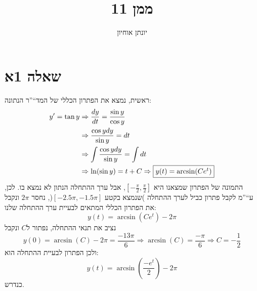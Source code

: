 \documentclass[11pt, oneside]{article}
\title{ממן 11}
\author{יונתן אוחיון}
\newcommand{\qed}{\R{$\blacksquare$}}
\newcommand{\logr}{\Rightarrow}
\begin{document}
\maketitle
\newpage

\section*{שאלה 1א}
ראשית, נמצא את הפתרון הכללי של המד``''ר הנתונה:
\begin{align*}
y^{\prime} = \tan{y}
& \logr \frac{dy}{dt} = \frac{\sin{y}}{\cos{y}}\\
& \logr \frac{\cos{y}dy}{\sin{y}} = dt\\
& \logr \int \frac{\cos{y}dy}{\sin{y}} = \int dt\\
& \logr \ln(\sin{y}) = t + C
\logr \framebox{$y(t) = \arcsin(C e^{t})$}
\end{align*}
התמונה של הפתרון שמצאנו היא $[-\frac{\pi}{2}, \frac{\pi}{2}]$, אבל ערך ההתחלה הנתון לא נמצא בו. לכן, ע``''מ לקבל פתרון כביל לערך ההתחלה )שנמצא בקטע $[-2.5\pi, -1.5\pi]$(, נחסר $2\pi$ ונקבל את הפתרון הכללי המתאים לבעיית ערך ההתחלה שלנו:
\[
y(t) = \arcsin(Ce^{t}) - 2\pi
\]
נציב את תנאי ההתחלה, נפתור ל$C$ ונקבל
\[
y(0) = \arcsin(C) - 2\pi = \frac{-13\pi}{6}
\logr \arcsin(C) = \frac{-\pi}{6}
\logr C = -\frac{1}{2}
\]
ולכן הפתרון לבעיית ההתחלה הוא:
\[
y(t) = \arcsin\left(\frac{-e^{t}}{2}\right) - 2\pi
\]
כנדרש.
\\\qed
\end{document}
